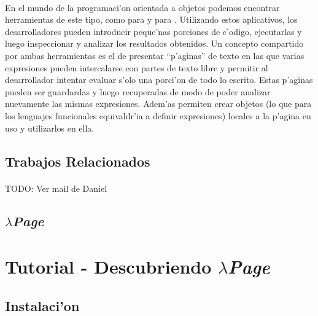\documentclass[a4paper]{article}
\newcommand{\hpage}{\textbf{\textsl{$\lambda$Page}} }
\begin{document}
\paragraph{}En el mundo de la programaci'on orientada a objetos podemos encontrar herramientas de este tipo, como  para  y  para .  Utilizando estos aplicativos, los desarrolladores pueden introducir peque'nas porciones de c'odigo, ejecutarlas y luego inspeccionar y analizar los resultados obtenidos.  Un concepto compartido por ambas herramientas es el de presentar ``p'aginas'' de texto en las que varias expresiones pueden intercalarse con partes de texto libre y permitir al desarrollador intentar evaluar s'olo una porci'on de todo lo escrito.  Estas p'aginas pueden ser guardardas y luego recuperadas de modo de poder analizar nuevamente las mismas expresiones.  Adem'as permiten crear objetos (lo que para los lenguajes funcionales equivaldr'ia a definir expresiones) locales a la p'agina en uso y utilizarlos en ella.

\subsection{Trabajos Relacionados}
\paragraph{}TODO: Ver mail de Daniel

\subsection{\hpage}
\newpage

\section{Tutorial - Descubriendo \hpage}
\subsection{Instalaci'on}
\end{document}
